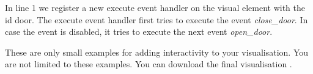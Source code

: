 In line 1 we register a new execute event handler on the visual element with the id door.
The execute event handler first tries to execute the event \textit{close\_door}.
In case the event is disabled, it tries to execute the next event \textit{open\_door}.

These are only small examples for adding interactivity to your visualisation.
You are not limited to these examples.
You can download the final visualisation .
